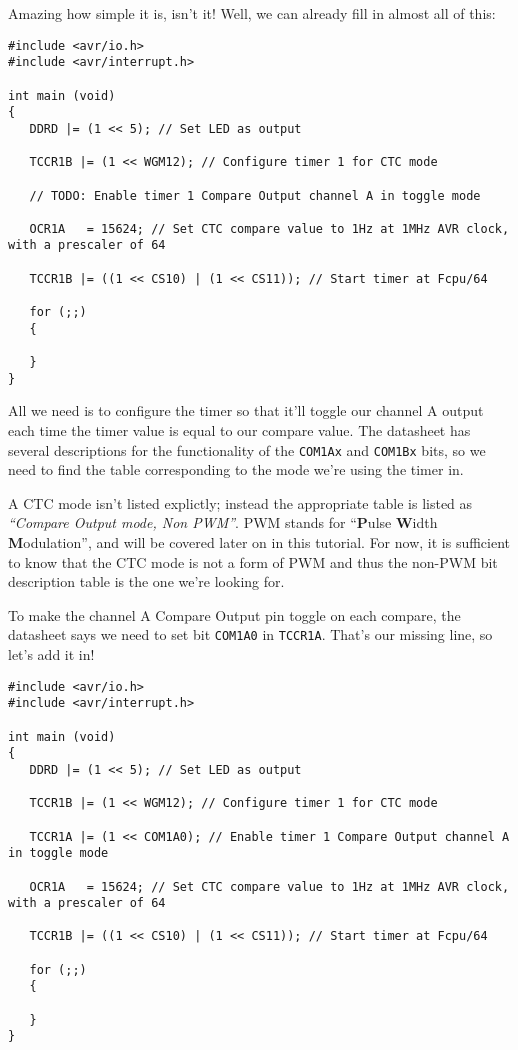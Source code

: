 \documentclass[a4paper,oneside]{book}
\begin{document}
Amazing how simple it is, isn't it! Well, we can already fill in almost all of this: 

\begin{center}
\begin{lstlisting}
#include <avr/io.h>
#include <avr/interrupt.h>

int main (void)
{
   DDRD |= (1 << 5); // Set LED as output

   TCCR1B |= (1 << WGM12); // Configure timer 1 for CTC mode

   // TODO: Enable timer 1 Compare Output channel A in toggle mode

   OCR1A   = 15624; // Set CTC compare value to 1Hz at 1MHz AVR clock, with a prescaler of 64

   TCCR1B |= ((1 << CS10) | (1 << CS11)); // Start timer at Fcpu/64

   for (;;)
   {

   }
}
\end{lstlisting}
\end{center}

All we need is to configure the timer so that it'll toggle our channel A output each time the timer value is equal to our compare value. The datasheet has several descriptions for the functionality of the \texttt{COM1Ax} and \texttt{COM1Bx} bits, so we need to find the table corresponding to the mode we're using the timer in.

A CTC mode isn't listed explictly; instead the appropriate table is listed as \textit{``Compare Output mode, Non PWM''}. PWM stands for ``\textbf{P}ulse \textbf{W}idth \textbf{M}odulation'', and will be covered later on in this tutorial. For now, it is sufficient to know that the CTC mode is not a form of PWM and thus the non-PWM bit description table is the one we're looking for.

To make the channel A Compare Output pin toggle on each compare, the datasheet says we need to set bit \texttt{COM1A0} in \texttt{TCCR1A}. That's our missing line, so let's add it in!

\begin{center}
\begin{lstlisting}
#include <avr/io.h>
#include <avr/interrupt.h>

int main (void)
{
   DDRD |= (1 << 5); // Set LED as output

   TCCR1B |= (1 << WGM12); // Configure timer 1 for CTC mode

   TCCR1A |= (1 << COM1A0); // Enable timer 1 Compare Output channel A in toggle mode

   OCR1A   = 15624; // Set CTC compare value to 1Hz at 1MHz AVR clock, with a prescaler of 64

   TCCR1B |= ((1 << CS10) | (1 << CS11)); // Start timer at Fcpu/64

   for (;;)
   {

   }
} 
\end{lstlisting}
\end{center}
\end{document}
